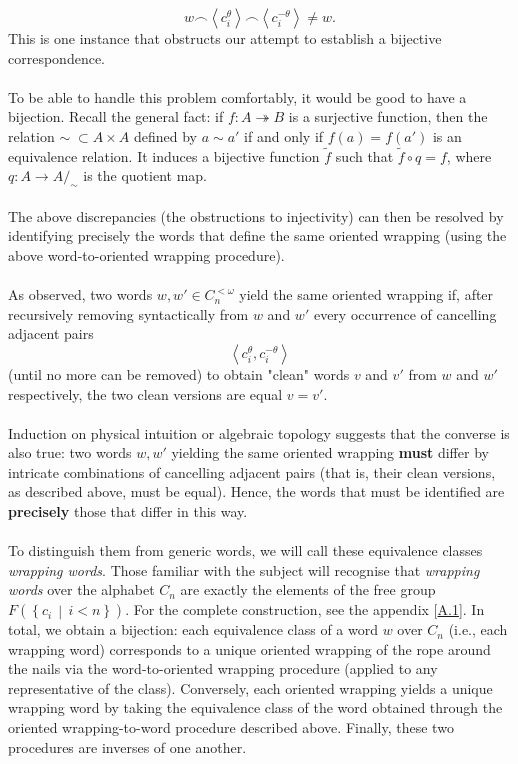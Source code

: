 \documentclass[11pt, a4paper, oneside]{article}
\theoremstyle{remark}
\theoremstyle{lemma}
\begin{document}
\[
w \frown \left\langle c_i^{\theta} \right\rangle \frown \left\langle c_i^{-\theta} \right\rangle \neq w.
\]
This is one instance that obstructs our attempt to establish a bijective correspondence.
\\\\
To be able to handle this problem comfortably, it would be good to have a bijection. Recall the general fact: if $f : A \twoheadrightarrow B$ is a surjective function, then the relation \( \sim\;\subset A \times A \) defined by \( a \sim a' \) if and only if \( f(a) = f(a') \) is an equivalence relation. It induces a bijective function \( \tilde{f}\) such that \( \tilde{f} \circ q = f \), where $q : A \to A/_{\sim}$ is the quotient map.
\\\\
The above discrepancies (the obstructions to injectivity) can then be resolved by identifying precisely the words that define the same oriented wrapping (using the above word-to-oriented wrapping procedure).
\\\\
As observed, two words \( w, w'\in C_n^{<\omega} \) yield the same oriented wrapping if, after recursively removing syntactically from \( w \) and \( w' \) every occurrence of cancelling adjacent pairs
\[
\left\langle c_i^{\theta}, c_i^{-\theta} \right\rangle
\]
(until no more can be removed) to obtain "clean" words \( v \) and \( v' \) from \( w \) and \( w' \) respectively, the two clean versions are equal \(v=v'\).
\\\\
Induction on physical intuition or algebraic topology suggests that the converse is also true: two words \(w, w'\) yielding the same oriented wrapping \textbf{must} differ by intricate combinations of cancelling adjacent pairs (that is, their clean versions, as described above, must be equal). Hence, the words that must be identified are \textbf{precisely} those that differ in this way.
\\\\
To distinguish them from generic words, we will call these equivalence classes \textit{wrapping words}. Those familiar with the subject will recognise that \textit{wrapping words} over the alphabet \( C_n \) are exactly the elements of the free group \( F\left( \left\{ c_i \,\middle|\, i < n \right\} \right) \). For the complete construction, see the appendix [\hyperref[A1]{A.1}]. In total, we obtain a bijection: each equivalence class of a word \(w\) over \(C_n\) (i.e., each wrapping word) corresponds to a unique oriented wrapping of the rope around the nails via the word-to-oriented wrapping procedure (applied to any representative of the class). Conversely, each oriented wrapping yields a unique wrapping word by taking the equivalence class of the word obtained through the oriented wrapping-to-word procedure described above. Finally, these two procedures are inverses of one another.
\end{document}
